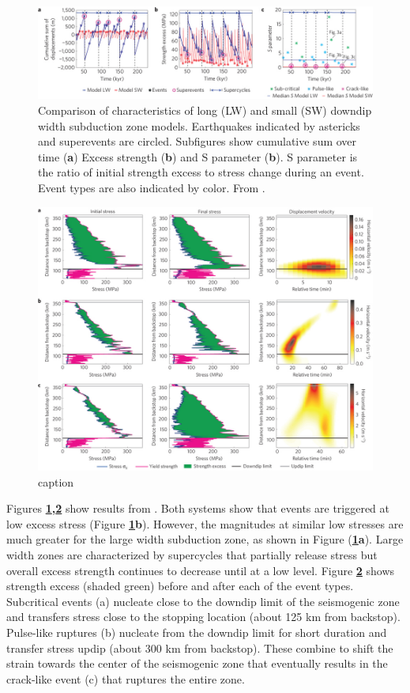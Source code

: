 \documentclass[draft,jgrga]{agutex}
\begin{document}
\begin{figure}
	\includegraphics[width=1\linewidth]{Figures/Herrendorfer/ngeo2427-f2.jpeg}
	\caption{Comparison of characteristics of long (LW) and small (SW) downdip width subduction zone models. Earthquakes indicated by astericks and superevents are circled. Subfigures show cumulative sum over time ({\bf a}) Excess strength ({\bf b}) and S parameter ({\bf b}). S parameter is the ratio of initial strength excess to stress change during an event. Event types are also indicated by color. From \citet{Herrendorfer2015}.}
	\label{fig:SZOwidth}
\end{figure}
\begin{figure}
	\includegraphics[width=1\linewidth]{Figures/Herrendorfer/ngeo2427-f3.jpeg}
	\caption{caption}
	\label{fig:ruptureStyle}
\end{figure}

Figures {\bf \ref{fig:SZOwidth},\ref{fig:ruptureStyle}} show results from \citet{Herrendorfer2015}. Both systems show that events are triggered at low excess stress (Figure {\bf \ref{fig:SZOwidth}b}). However, the magnitudes at similar low stresses are much greater for the large width subduction zone, as shown in Figure ({\bf \ref{fig:SZOwidth}a}). Large width zones are characterized by supercycles that partially release stress but overall excess strength continues to decrease until at a low level. Figure {\bf \ref{fig:ruptureStyle}} shows strength excess (shaded green) before and after each of the event types. Subcritical events (a) nucleate close to the downdip limit of the seismogenic zone and transfers stress close to the stopping location (about 125 km from backstop). Pulse-like ruptures (b) nucleate from the downdip limit for short duration and transfer stress updip (about 300 km from backstop). These combine to shift the strain towards the center of the seismogenic zone that eventually results in the crack-like event (c) that ruptures the entire zone. 
\end{document}
